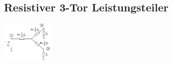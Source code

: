 \documentclass[english]{latex4ei/latex4ei_sheet}
\begin{document}
\begin{sectionbox}
    \subsection{Resistiver 3-Tor Leistungsteiler}
    \begin{center}\includegraphics[width = 2.5cm]{./img/res-3tor.png}
        \end{center}
\end{sectionbox}
\end{document}
